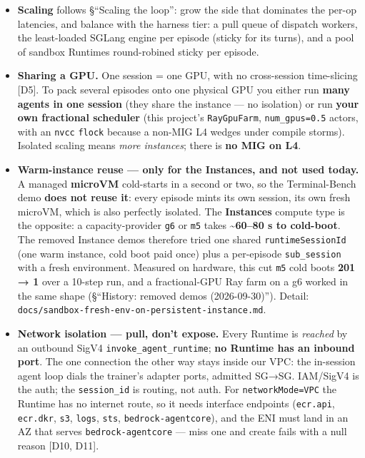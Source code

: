 \documentclass[
  paper=a4,
  ,captions=tableheading
]{scrartcl}
\providecommand{\tightlist}{%
  \setlength{\itemsep}{0pt}\setlength{\parskip}{0pt}}
\begin{document}
\begin{itemize}
\tightlist
\item
  \textbf{Scaling} follows §``Scaling the loop'': grow the side that
  dominates the per-op latencies, and balance with the harness tier: a
  pull queue of dispatch workers, the least-loaded SGLang engine per
  episode (sticky for its turns), and a pool of sandbox Runtimes
  round-robined sticky per episode.
\item
  \textbf{Sharing a GPU.} One session = one GPU, with no cross-session
  time-slicing {[}D5{]}. To pack several episodes onto one physical GPU
  you either run \textbf{many agents in one session} (they share the
  instance --- no isolation) or run \textbf{your own fractional
  scheduler} (this project's \texttt{RayGpuFarm}, \texttt{num\_gpus=0.5}
  actors, with an \texttt{nvcc} \texttt{flock} because a non-MIG L4
  wedges under compile storms). Isolated scaling means \emph{more
  instances}; there is \textbf{no MIG on L4}.
\item
  \textbf{Warm-instance reuse --- only for the Instances, and not used
  today.} A managed \textbf{microVM} cold-starts in a second or two, so
  the Terminal-Bench demo \textbf{does not reuse it}: every episode
  mints its own session, its own fresh microVM, which is also perfectly
  isolated. The \textbf{Instances} compute type is the opposite: a
  capacity-provider \texttt{g6} or \texttt{m5} takes
  \textbf{\textasciitilde60--80 s to cold-boot}. The removed Instance
  demos therefore tried one shared \texttt{runtimeSessionId} (one warm
  instance, cold boot paid once) plus a per-episode
  \texttt{sub\_session} with a fresh environment. Measured on hardware,
  this cut \texttt{m5} cold boots \textbf{201 → 1} over a 10-step run,
  and a fractional-GPU Ray farm on a g6 worked in the same shape
  (§``History: removed demos (2026-09-30)''). Detail:
  \texttt{docs/sandbox-fresh-env-on-persistent-instance.md}.
\item
  \textbf{Network isolation --- pull, don't expose.} Every Runtime is
  \emph{reached} by an outbound SigV4 \texttt{invoke\_agent\_runtime};
  \textbf{no Runtime has an inbound port}. The one connection the other
  way stays inside our VPC: the in-session agent loop dials the
  trainer's adapter ports, admitted SG→SG. IAM/SigV4 is the auth; the
  \texttt{session\_id} is routing, not auth. For
  \texttt{networkMode=VPC} the Runtime has no internet route, so it
  needs interface endpoints (\texttt{ecr.api}, \texttt{ecr.dkr},
  \texttt{s3}, \texttt{logs}, \texttt{sts}, \texttt{bedrock-agentcore}),
  and the ENI must land in an AZ that serves \texttt{bedrock-agentcore}
  --- miss one and create fails with a null reason {[}D10, D11{]}.
\end{itemize}
\end{document}
